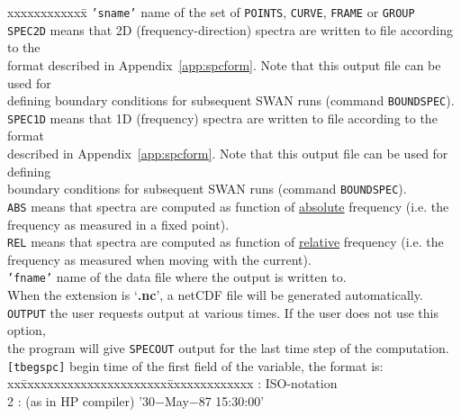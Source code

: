 \documentclass[12pt]{book}
\begin{document}
\begin{tabbing}
 xxxxxxxxxxxx\= \kill
{\tt {'sname'}} \> name of the set of {\tt POINTS}, {\tt CURVE}, {\tt FRAME} or {\tt GROUP}\\
{\tt SPEC2D}    \> means that 2D (frequency-direction) spectra are written to file according to the\+\\
                   format described in Appendix~\ref{app:spcform}. Note that this output file can be used for\\
                   defining boundary conditions for subsequent SWAN runs (command {\tt BOUNDSPEC}).\-\\
{\tt SPEC1D}    \> means that 1D (frequency) spectra are written to file according to the format\+\\
                   described in Appendix~\ref{app:spcform}. Note that this output file can be used for defining\\
                   boundary conditions for subsequent SWAN runs (command {\tt BOUNDSPEC}).\-\\
{\tt ABS}       \> means that spectra are computed as function of \underline{absolute} frequency (i.e. the\+\\
                   frequency as measured in a fixed point).\-\\
{\tt REL}       \> means that spectra are computed as function of \underline{relative} frequency (i.e. the\+\\
                   frequency as measured when moving with the current).\-\\
{\tt {'fname'}} \> name of the data file where the output is written to.\+\\
                   When the extension is `{\bf .nc}', a netCDF file will be generated automatically.\-\\
{\tt OUTPUT}    \> the user requests output at various times. If the user does not use this option,\+\\
                   the program will give {\tt SPECOUT} output for the last time step of the computation.\-\\
{\tt [tbegspc]} \> begin time of the first field of the variable, the format is:\+\\
                   \pushtabs
                   xx\=xxxxxxxxxxxxxxxxxxxxxx\=xxxxxxxxxxxxx  \>: ISO-notation                     \\
                   2 \>: (as in HP compiler)    \> '30$-$May$-$87 15:30:00' \\

\end{tabbing}
\end{document}
